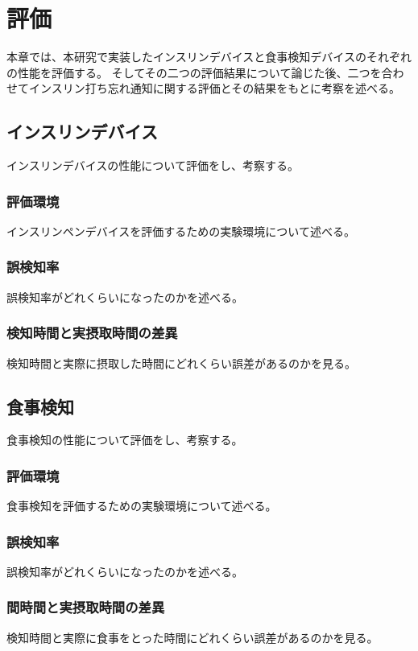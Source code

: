 \chapter{評価}
\label{chap:evaluation}

本章では、本研究で実装したインスリンデバイスと食事検知デバイスのそれぞれの性能を評価する。
そしてその二つの評価結果について論じた後、二つを合わせてインスリン打ち忘れ通知に関する評価とその結果をもとに考察を述べる。

\section{インスリンデバイス}
インスリンデバイスの性能について評価をし、考察する。

\subsection{評価環境}
インスリンペンデバイスを評価するための実験環境について述べる。

\subsection{誤検知率}
誤検知率がどれくらいになったのかを述べる。

\subsection{検知時間と実摂取時間の差異}
検知時間と実際に摂取した時間にどれくらい誤差があるのかを見る。

\section{食事検知}
食事検知の性能について評価をし、考察する。

\subsection{評価環境}
食事検知を評価するための実験環境について述べる。

\subsection{誤検知率}
誤検知率がどれくらいになったのかを述べる。

\subsection{間時間と実摂取時間の差異}
検知時間と実際に食事をとった時間にどれくらい誤差があるのかを見る。

